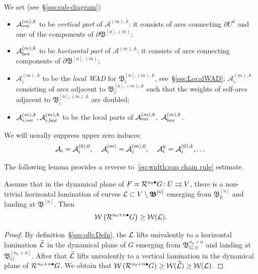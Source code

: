 \documentclass{amsart}
\newcommand{\bush}{{\mathfrak B }}
\newcommand{\bbush}{{\boldsymbol {\mathfrak B} }}
\renewcommand{\sp}{{\ \ }}
\newcommand{\1}{{\mathbb 1 }}
\newcommand{\Width}{{\mathcal W}}
\renewcommand{\AA}{{\mathcal A}}
\begin{document}
We set (see~\S\ref{sss:sub-diagram}) 
\begin{itemize}
\item $\AA^{(m),k}_\ver$ to be \emph{vertical part} of $\AA^{(m),k}$: it consists of arcs connecting $\partial U^k$ and one of the components of $\partial \bbush^{[n],(m)}$;
\item $\AA^{(m),k}_\hor$ to be \emph{horizontal part} of $\AA^{(m),k}$: it consists of arcs connecting components of $\partial \bbush^{[n],(m)}$;
\item $\AA_i^{(m),k}$ to be the \emph{local WAD} for $\bush^{[n],(m),k}_i$, see~\S\ref{sss:LocalWAD}: $\AA_i^{(m),k}$ consisting of arcs adjacent to $\bush^{[n],(m),k}_i$ such that the weights of self-arcs adjacent to $\bush^{[n],(m),k}_i$ are doubled;
\item $\AA_{i,\ver}^{(m),k},\AA_{i,\hor}^{(m),k} $ to be the local parts of $\AA^{(m),k}_\ver,\ \AA^{(m),k}_\hor$.
\end{itemize}

We will usually suppress upper zero induces:
\[\AA_i=\AA^{(0),0}_i, \hspace{0.4cm}\AA_i^{(m)}=\AA^{(m),0}_i, \hspace{0.4cm}\AA_i^{k}=\AA^{(0),k}_i, \dots \]


The following lemma provides a reverse to~\eqref{eq:width:sup chain rule} estimate. 

\begin{lem}
\label{lem:reverse to sup chain rule}
Assume that in the dynamical plane of $F={\mathcal R}^{n_0 \bullet }G\colon U\rightrightarrows V$, there is a non-trivial horizontal lamination of curves $\LL\subset V\setminus \bbush^{[n]}$ emerging from $\bush^{[n]}_0$ and landing at $\bbush^{[n]}$. Then 
\[\Width\left( \RR^{n_0+n \bullet }G \right)\ge \Width(\LL).\]
\end{lem}
\begin{proof}
By definition~\S\ref{sss:qlb:Defn}, the ${\mathcal L}$ lifts univalently to a horizontal lamination $\widetilde {{\mathcal L}}$ in the dynamical plane of $G$ emerging from $\bush^{n_0+n}_{G, 0}$ and landing at $\bbush^{[n_0+n]}_{G}$. After that $\widetilde {{\mathcal L}}$ lifts univalently to a vertical lamination in the dynamical plane of ${\mathcal R}^{n_0+n \bullet }G$. We obtain that $\Width\left( \RR^{n_0+n \bullet }G \right)\ge \Width(\widetilde \LL)\ge \Width(\LL)$.
\end{proof}
\end{document}
